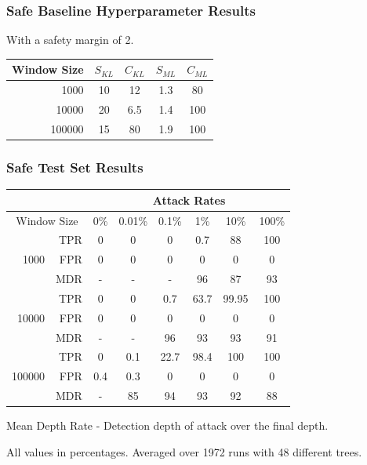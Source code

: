 \documentclass{beamer}
\begin{document}
\begin{frame}
    \frametitle{Safe Baseline Hyperparameter Results}
    With a safety margin of 2.
    \begin{center}
        \begin{tabular}{| r | c c | c c |}
        \hline
        Window Size & $S_{KL}$ & $C_{KL}$ & $S_{ML}$ & $C_{ML}$ \\
        \hline 
        1000 & 10 & 12 & 1.3 & 80 \\
        \hline 
        10000 & 20 & 6.5 & 1.4 & 100 \\
        \hline 
        100000 & 15 & 80 & 1.9 & 100 \\
        \hline 
    \end{tabular}
    \end{center}
\end{frame}

\begin{frame}
    \frametitle{Safe Test Set Results}
    \begin{center}
        \begin{tabular}{| r | r | c c c c c c |}
        \hline
         & & \multicolumn{6}{|c|}{Attack Rates} \\
        \hline
        \multicolumn{2}{|c|}{Window Size} & 0\% & 0.01\% & 0.1\% & 1\% & 10\% & 100\% \\
        \hline
        \multirow{3}{*}{1000} & TPR & 0 & 0 & 0 & 0.7 & 88 & 100 \\
                              & FPR & 0 & 0 & 0 &   0 &  0 & 0 \\
                              & MDR &   - &   - &   - &  96 & 87 &  93 \\
        \hline
        \multirow{3}{*}{10000} & TPR & 0 & 0 & 0.7 & 63.7 & 99.95 & 100 \\
                               & FPR & 0 & 0 &   0 &    0 &     0 & 0 \\
                               & MDR &   - &   - &  96 &   93 &    93 & 91 \\
        \hline
        \multirow{3}{*}{100000} & TPR &   0 & 0.1 & 22.7 & 98.4 & 100 & 100 \\
                                & FPR & 0.4 & 0.3 &    0 &    0 &   0 & 0 \\
                                & MDR &     - &  85 &   94 &   93 &  92 & 88 \\
        \hline
    \end{tabular}
    \end{center}
    Mean Depth Rate - Detection depth of attack over the final depth. 
    
    All values in percentages. Averaged over 1972 runs with 48 different trees.
\end{frame}
\end{document}
